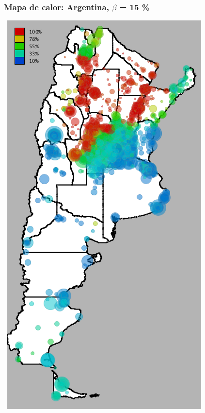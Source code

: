 \documentclass{beamer}
\begin{document}
\begin{frame}
	\frametitle{Mapa de calor: Argentina, $\beta$ = 15 \%}
	\center\
	\includegraphics[height=.9\textheight,width = .9\columnwidth, keepaspectratio]
	{slides/201112_hi_res_argentina_usuarios_proporcion_circulos_beta15.png}
\end{frame}
\end{document}
